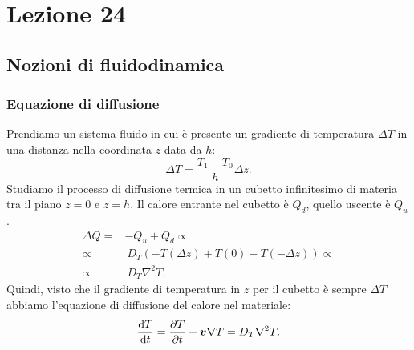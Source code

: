 \section{Lezione 24}%
\label{sub:Lezione 24}
\subsection{Nozioni di fluidodinamica}%
\label{sub:Nozioni di fluidodinamica}
\subsubsection{Equazione di diffusione}%
\label{subsub:Equazione di diffusione}
Prendiamo un sistema fluido in cui è presente un gradiente di temperatura $\Delta T$ in una distanza nella coordinata $z$ data da $h$:
\[
    \Delta T = \frac{T_1-T_0}{h}\Delta z
.\] 
Studiamo il processo di diffusione termica in un cubetto infinitesimo di materia tra il piano $z=0$ e $z=h$. Il calore entrante nel cubetto è $Q_d$, quello uscente è $Q_u$.
\[\begin{aligned}
    \Delta Q =& - Q_u+Q_d \propto\\
    \propto & \ D_T (-T(\Delta z)+T(0) - T(-\Delta z)) \propto\\
    \propto & \ D_T \nabla ^2T
.\end{aligned}\]
Quindi, visto che il gradiente di temperatura in $z$ per il cubetto è sempre $\Delta T$ abbiamo l'equazione di diffusione del calore nel materiale:
\[
    \frac{\text{d} T}{\text{d} t} = \frac{\partial T}{\partial t}  + \boldsymbol{v}\nabla T = D_T \nabla ^2T
.\] 
